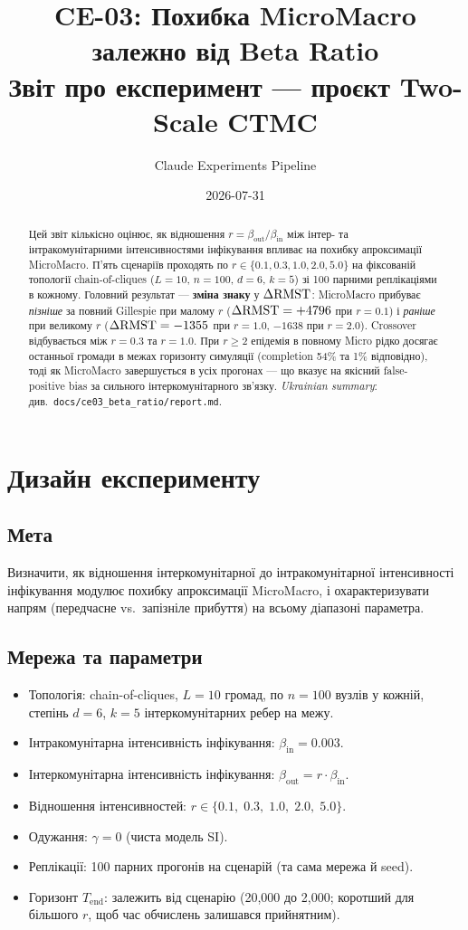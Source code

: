 \documentclass[11pt,a4paper]{article}
\title{CE-03: Похибка MicroMacro залежно від Beta Ratio\\
       \large Звіт про експеримент --- проєкт Two-Scale CTMC}
\author{Claude Experiments Pipeline}
\date{2026-07-31}
\begin{document}
\maketitle

\begin{abstract}
Цей звіт кількісно оцінює, як відношення $r = \beta_{\text{out}}/\beta_{\text{in}}$
між інтер- та інтракомунітарними інтенсивностями інфікування впливає на похибку
апроксимації MicroMacro. П'ять сценаріїв проходять по $r \in \{0.1, 0.3, 1.0, 2.0, 5.0\}$
на фіксованій топології chain-of-cliques ($L=10$, $n=100$, $d=6$, $k=5$)
зі 100 парними реплікаціями в кожному.
Головний результат --- \textbf{зміна знаку} у $\Delta\mathrm{RMST}$:
MicroMacro прибуває \emph{пізніше} за повний Gillespie при малому $r$
($\Delta\mathrm{RMST} = {+}4796$ при $r=0.1$) і \emph{раніше} при великому $r$
($\Delta\mathrm{RMST} = -1355$ при $r=1.0$, $-1638$ при $r=2.0$).
Crossover відбувається між $r=0.3$ та $r=1.0$.
При $r \ge 2$ епідемія в повному Micro рідко досягає останньої громади
в межах горизонту симуляції (completion 54\% та 1\% відповідно),
тоді як MicroMacro завершується в усіх прогонах --- що вказує на якісний
false-positive bias за сильного інтеркомунітарного зв'язку.
\textit{Ukrainian summary}: див.\ \texttt{docs/ce03\_beta\_ratio/report.md}.
\end{abstract}

\section{Дизайн експерименту}

\subsection{Мета}
Визначити, як відношення інтеркомунітарної до інтракомунітарної інтенсивності
інфікування модулює похибку апроксимації MicroMacro, і охарактеризувати напрям
(передчасне vs.\ запізніле прибуття) на всьому діапазоні параметра.

\subsection{Мережа та параметри}
\begin{itemize}
  \item Топологія: chain-of-cliques, $L=10$ громад, по $n=100$ вузлів у кожній,
        степінь $d=6$, $k=5$ інтеркомунітарних ребер на межу.
  \item Інтракомунітарна інтенсивність інфікування: $\beta_{\text{in}} = 0.003$.
  \item Інтеркомунітарна інтенсивність інфікування: $\beta_{\text{out}} = r \cdot \beta_{\text{in}}$.
  \item Відношення інтенсивностей: $r \in \{0.1,\; 0.3,\; 1.0,\; 2.0,\; 5.0\}$.
  \item Одужання: $\gamma = 0$ (чиста модель SI).
  \item Реплікації: 100 парних прогонів на сценарій (та сама мережа й seed).
  \item Горизонт $T_{\text{end}}$: залежить від сценарію (20{,}000 до 2{,}000;
        коротший для більшого $r$, щоб час обчислень залишався прийнятним).
\end{itemize}
\end{document}
